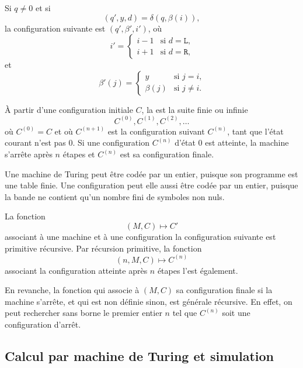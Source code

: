 Si $q\neq0$ et si
\[
(q',y,d)=\delta(q,\beta(i)),
\]
la configuration suivante est $(q',\beta',i')$, où
\[
i'=
\begin{cases}
i-1&\text{si $d=\texttt{L}$,}\\
i+1&\text{si $d=\texttt{R}$,}
\end{cases}
\]
et
\[
\beta'(j)=
\begin{cases}
y&\text{si $j=i$,}\\
\beta(j)&\text{si $j\neq i$.}
\end{cases}
\]

\thingy À partir d'une configuration initiale $C$, la
 est la suite finie ou
infinie
\[
C^{(0)},C^{(1)},C^{(2)},\ldots
\]
où $C^{(0)}=C$ et où $C^{(n+1)}$ est la configuration suivant
$C^{(n)}$, tant que l'état courant n'est pas $0$.  Si une configuration
$C^{(n)}$ d'état $0$ est atteinte, la machine s'arrête après $n$
étapes et $C^{(n)}$ est sa configuration finale.

\thingy Une machine de Turing peut être codée par un entier, puisque
son programme est une table finie.  Une configuration peut elle aussi
être codée par un entier, puisque la bande ne contient qu'un nombre
fini de symboles non nuls.

La fonction
\[
(M,C)\mapsto C'
\]
associant à une machine et à une configuration la configuration
suivante est primitive récursive.  Par récursion primitive, la
fonction
\[
(n,M,C)\mapsto C^{(n)}
\]
associant la configuration atteinte après $n$ étapes l'est également.

En revanche, la fonction qui associe à $(M,C)$ sa configuration finale
si la machine s'arrête, et qui est non définie sinon, est générale
récursive.  En effet, on peut rechercher sans borne le premier entier
$n$ tel que $C^{(n)}$ soit une configuration d'arrêt.

\subsection{Calcul par machine de Turing et simulation}

